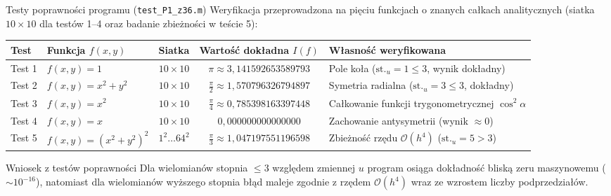 \documentclass[aspectratio=169, 10pt, xcolor={table}]{beamer}
\begin{document}
\begin{frame}{Testy poprawności programu (\texttt{test\_P1\_z36.m})}
  Weryfikacja przeprowadzona na pięciu funkcjach o znanych całkach analitycznych (siatka $10 \times 10$ dla testów 1--4 oraz badanie zbieżności w teście 5):

  \vspace{0.2cm}
  \begin{table}
    \centering
    \small
    \begin{tabular}{@{} l l c c l @{}}
      \toprule
      \textbf{Test} & \textbf{Funkcja $f(x,y)$} & \textbf{Siatka} & \textbf{Wartość dokładna $I(f)$} & \textbf{Własność weryfikowana} \\
      \midrule
      Test 1 & $f(x,y) = 1$ & $10 \times 10$ & $\pi \approx 3{,}141592653589793$ & Pole koła ($\text{st.}_u = 1 \le 3$, wynik dokładny) \\
      Test 2 & $f(x,y) = x^2 + y^2$ & $10 \times 10$ & $\frac{\pi}{2} \approx 1{,}570796326794897$ & Symetria radialna ($\text{st.}_u = 3 \le 3$, dokładny) \\
      Test 3 & $f(x,y) = x^2$ & $10 \times 10$ & $\frac{\pi}{4} \approx 0{,}785398163397448$ & Całkowanie funkcji trygonometrycznej $\cos^2\alpha$ \\
      Test 4 & $f(x,y) = x$ & $10 \times 10$ & $0{,}000000000000000$ & Zachowanie antysymetrii (wynik $\approx 0$) \\
      Test 5 & $f(x,y) = (x^2+y^2)^2$ & $1^2 \dots 64^2$ & $\frac{\pi}{3} \approx 1{,}047197551196598$ & Zbieżność rzędu $\mathcal{O}(h^4)$ ($\text{st.}_u = 5 > 3$) \\
      \bottomrule
    \end{tabular}
  \end{table}

  \vspace{0.15cm}
  \begin{block}{Wniosek z testów poprawności}
    Dla wielomianów stopnia $\le 3$ względem zmiennej $u$ program osiąga dokładność bliską zeru maszynowemu ($\sim 10^{-16}$), natomiast dla wielomianów wyższego stopnia błąd maleje zgodnie z rzędem $\mathcal{O}(h^4)$ wraz ze wzrostem liczby podprzedziałów.
  \end{block}
\end{frame}
\end{document}
